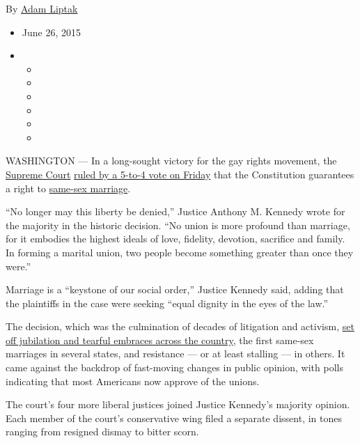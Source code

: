 By \href{http://www.nytimes3xbfgragh.onion/by/adam-liptak}{Adam Liptak}

\begin{itemize}
\item
  June 26, 2015
\item
  \begin{itemize}
  \item
  \item
  \item
  \item
  \item
  \item
  \end{itemize}
\end{itemize}

WASHINGTON --- In a long-sought victory for the gay rights movement, the
\href{http://topics.nytimes3xbfgragh.onion/top/reference/timestopics/organizations/s/supreme_court/index.html?inline=nyt-org}{Supreme
Court}
\href{http://www.supremecourt.gov/opinions/14pdf/14-556_3204.pdf}{ruled
by a 5-to-4 vote on Friday} that the Constitution guarantees a right to
\href{http://topics.nytimes3xbfgragh.onion/top/reference/timestopics/subjects/s/same_sex_marriage/index.html?inline=nyt-classifier}{same-sex
marriage}.

``No longer may this liberty be denied,'' Justice Anthony M. Kennedy
wrote for the majority in the historic decision. ``No union is more
profound than marriage, for it embodies the highest ideals of love,
fidelity, devotion, sacrifice and family. In forming a marital union,
two people become something greater than once they were.''

Marriage is a ``keystone of our social order,'' Justice Kennedy said,
adding that the plaintiffs in the case were seeking ``equal dignity in
the eyes of the law.''

The decision, which was the culmination of decades of litigation and
activism,
\href{http://www.nytimes3xbfgragh.onion/live/supreme-court-rulings/?hp\&action=click\&pgtype=Homepage\&module=a-lede-package-region\&region=top-news\&WT.nav=top-news}{set
off jubilation and tearful embraces across the country}, the first
same-sex marriages in several states, and resistance --- or at least
stalling --- in others. It came against the backdrop of fast-moving
changes in public opinion, with polls indicating that most Americans now
approve of the unions.

The court's four more liberal justices joined Justice Kennedy's majority
opinion. Each member of the court's conservative wing filed a separate
dissent, in tones ranging from resigned dismay to bitter scorn.

